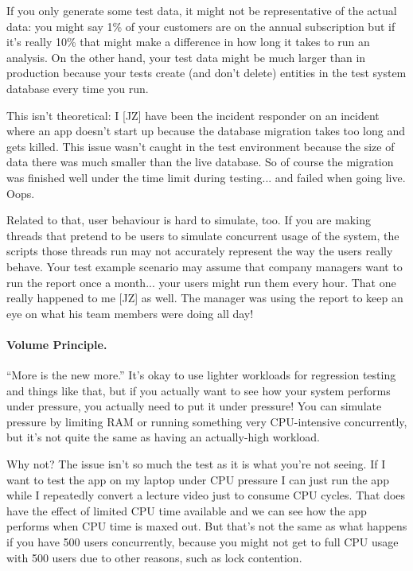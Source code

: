 If you only generate some test data, it might not be representative of the actual data: you might say 1\% of your customers are on the annual subscription but if it's really 10\% that might make a difference in how long it takes to run an analysis. On the other hand, your test data might be much larger than in production because your tests create (and don't delete) entities in the test system database every time you run.

This isn't theoretical: I [JZ] have been the incident responder on an incident where an app doesn't start up because the database migration takes too long and gets killed. This issue wasn't caught in the test environment because the size of data there was much smaller than the live database. So of course the migration was finished well under the time limit during testing... and failed when going live. Oops.

Related to that, user behaviour is hard to simulate, too. If you are making threads that pretend to be users to simulate concurrent usage of the system, the scripts those threads run may not accurately represent the way the users really behave.  Your test example scenario may assume that company managers want to run the report once a month... your users might run them every hour. That one really happened to me [JZ] as well. The manager was using the report to keep an eye on what his team members were doing all day!

\paragraph{Volume Principle.}
``More is the new more.'' It's okay to use lighter workloads for regression testing and things like that, but if you actually want to see how your system performs under pressure, you actually need to put it under pressure! You can simulate pressure by limiting RAM or running something very CPU-intensive concurrently, but it's not quite the same as having an actually-high workload. 

Why not? The issue isn't so much the test as it is what you're not seeing. If I want to test the app on my laptop under CPU pressure I can just run the app while I repeatedly convert a lecture video just to consume CPU cycles. That does have the effect of limited CPU time available and we can see how the app performs when CPU time is maxed out. But that's not the same as what happens if you have 500 users concurrently, because you might not get to full CPU usage with 500 users due to other reasons, such as lock contention. 

